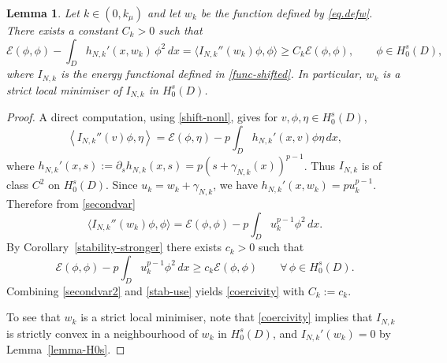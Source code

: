 \documentclass[11pt,a4paper,reqno]{amsart}
\newtheorem{lemma}[theorem]{\bf Lemma}
\theoremstyle{definition}
\numberwithin{equation}{section}
\begin{document}
 
\begin{lemma}
\label{lemma-coer}
 Let   $k\in(0,k_\mu)$ and let $w_k$ be the function defined by \eqref{eq.defw}.
There exists
  a constant $C_{k}>0$ such that
  \begin{equation}\label{coercivity}
\mathcal{E}(\phi,\phi)-\int_{D}h_{N,k}'(x,w_{k})\,\phi^{2}\,dx=    \bigl\langle I_{N,k}''(w_{k})\phi,\phi\bigr\rangle
    \geq C_{k}\mathcal E(\phi,\phi),
    \qquad\phi\in H_{0}^{s}(D),
  \end{equation}
  where $I_{N,k}$ is the energy functional defined in \eqref{func-shifted}.
  In particular, $w_{k}$ is a strict local minimiser of $I_{N,k}$ in
  $H_{0}^{s}(D)$.
\end{lemma}
 
\begin{proof}
A direct computation, using \eqref{shift-nonl},  gives for $v,\phi,\eta\in H^s_0(D)$,
\begin{equation}\label{secondvar}
\left\langle I_{N,k}''(v)\phi,\eta\right\rangle
=
\mathcal E(\phi,\eta)
-p\int_D h_{N,k}'(x,v)\phi\eta\,dx,
\end{equation}
where $h_{N,k}'(x,s):=\partial_{s}h_{N,k}(x,s)=p(s+\gamma_{N,k}(x))^{p-1}$.
Thus  $I_{N,k}$  is of
class $C^2$ on $H_0^s(D)$. 
Since $u_{k}=w_{k}+\gamma_{N,k}$, we have $h_{N,k}'(x,w_{k})=pu_{k}^{p-1}$.
Therefore from \eqref{secondvar} 
\begin{equation}\label{secondvar2}
  \bigl\langle I_{N,k}''(w_{k})\phi,\phi\bigr\rangle
  =\mathcal E(\phi,\phi)-p\int_{D}u_{k}^{p-1}\phi^{2}\,dx.
\end{equation}
By Corollary~\ref{stability-stronger} there exists $c_{k}>0$ such that
\begin{equation}\label{stab-use}
  \mathcal E(\phi,\phi)-p\int_{D}u_{k}^{p-1}\phi^{2}\,dx\geq c_{k}\mathcal E(\phi,\phi)
  \qquad\forall\,\phi\in H_{0}^{s}(D).
\end{equation}
Combining \eqref{secondvar2} and \eqref{stab-use} yields \eqref{coercivity}
with $C_{k}:=c_{k}$.
 
To see that $w_{k}$ is a strict local minimiser, note that \eqref{coercivity}
implies that $I_{N,k}$ is strictly convex in a neighbourhood of $w_{k}$ in
$H_{0}^{s}(D)$, and $I_{N,k}'(w_{k})=0$ by Lemma~\ref{lemma-H0s}.
\end{proof}
\end{document}
